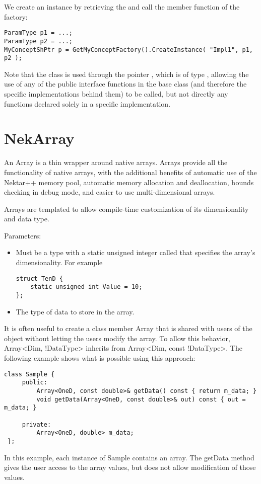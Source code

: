 We create an instance by retrieving the  and call the
 member function of the factory:
\begin{lstlisting}[style=C++Style]
ParamType p1 = ...;
ParamType p2 = ...;
MyConceptShPtr p = GetMyConceptFactory().CreateInstance( "Impl1", p1, p2 );
\end{lstlisting}

Note that the class is used through the pointer , which is of type
, allowing the use of any of the public interface
functions in the base class (and therefore the specific implementations behind them) to be
called, but not directly any functions declared solely in a specific
implementation.


\section{NekArray}
An Array is a thin wrapper around native arrays. Arrays provide all the
functionality of native arrays, with the additional benefits of automatic use of
the Nektar++ memory pool, automatic memory allocation and deallocation, bounds
checking in debug mode, and easier to use multi-dimensional arrays.

Arrays are templated to allow compile-time customization of its dimensionality
and data type.

Parameters:
\begin{itemize}
\item {} Must be a type with a static unsigned integer called
 that specifies the array's dimensionality. For example
\begin{lstlisting}[style=C++Style]
struct TenD {
    static unsigned int Value = 10;
};
\end{lstlisting}
\item {} The type of data to store in the array.
\end{itemize}

It is often useful to create a class member Array that is shared with users of
the object without letting the users modify the array. To allow this behavior,
Array<Dim, !DataType> inherits from Array<Dim, const !DataType>. The following
example shows what is possible using this approach:
\begin{lstlisting}[style=C++Style]
 class Sample {
     public:
         Array<OneD, const double>& getData() const { return m_data; }
         void getData(Array<OneD, const double>& out) const { out = m_data; }

     private:
         Array<OneD, double> m_data;
 };
\end{lstlisting}
In this example, each instance of Sample contains an array. The getData
method gives the user access to the array values, but does not allow
modification of those values.

